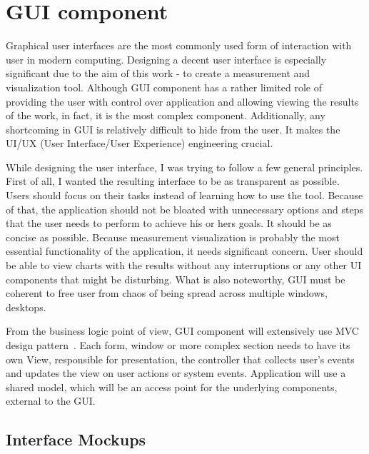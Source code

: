 %
\section{GUI component}
\label{sec:arch_gui}

Graphical user interfaces are the most commonly used form of interaction with user in modern computing. Designing a decent user interface is especially significant due to the aim of this work - to create a measurement and visualization tool. Although GUI component has a rather limited role of providing the user with control over application and allowing viewing the results of the work, in fact, it is the most complex component. Additionally, any shortcoming in GUI is relatively difficult to hide from the user. It makes the UI/UX (User Interface/User Experience) engineering crucial.

While designing the user interface, I was trying to follow a few general principles. First of all, I wanted the resulting interface to be as transparent as possible. Users should focus on their tasks instead of learning how to use the tool. Because of that, the application should not be bloated with unnecessary options and steps that the user needs to perform to achieve his or hers goals. It should be as concise as possible. Because measurement visualization is probably the most essential functionality of the application, it needs significant concern. User should be able to view charts with the results without any interruptions or any other UI components that might be disturbing. What is also noteworthy, GUI must be coherent to free user from chaos of being spread across multiple windows, desktops.

From the business logic point of view, GUI component will extensively use MVC design pattern~\cite{gamma1995}. Each form, window or more complex section needs to have its own View, responsible for presentation, the controller that collects user's events and updates the view on user actions or system events. Application will use a shared model, which will be an access point for the underlying components, external to the GUI.

\subsection{Interface Mockups}

